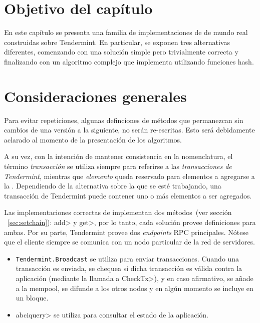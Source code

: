 \section{Objetivo del capítulo}

En este capítulo se presenta una familia de implementaciones de \setchain de mundo
real construidas sobre Tendermint.
%
En particular, se exponen tres alternativas diferentes, comenzando con una
solución simple pero trivialmente correcta y finalizando con un algoritmo
complejo que implementa \setchain utilizando funciones hash.
%

\section{Consideraciones generales}\label{sec:impl}
Para evitar repeticiones, algunas definciones de métodos que permanezcan sin cambios
de una versión a la siguiente, no serán re-escritas.
Esto será debidamente aclarado al momento de la presentación de los algoritmos.

%
A su vez, con la intención de mantener consistencia en la nomenclatura,
el término \textit{transacción} se utiliza siempre para referirse a las
\textit{transacciones de Tendermint}, mientras
que \textit{elemento} queda reservado para elementos a agregarse a la \setchain.
%
Dependiendo de la alternativa sobre la que se esté trabajando, una transacción de
Tendermint puede contener uno o más elementos a ser agregados.
%

Las implementaciones correctas de \setchain implementan dos métodos~(ver sección
~\ref{sec:setchain}): \<add> y \<get>, por lo tanto, cada solución provee definiciones
para ambas.
%
Por su parte, Tendermint provee dos \textit{endpoints} RPC principales.
Nótese que el cliente siempre se comunica con un nodo particular de la red de servidores.
\begin{itemize}
  \item \texttt{Tendermint.Broadcast} se utiliza para enviar transacciones.
  Cuando una transacción es enviada, se chequea si dicha transacción
  es válida contra la aplicación (mediante la llamada a \<CheckTx>), y en caso
  afirmativo, se añade
  a la mempool, se difunde a los otros nodos y en algún momento se incluye en
  un bloque.
  \item \<abciquery> se utiliza para consultar el estado de la
  aplicación.
\end{itemize}
%

